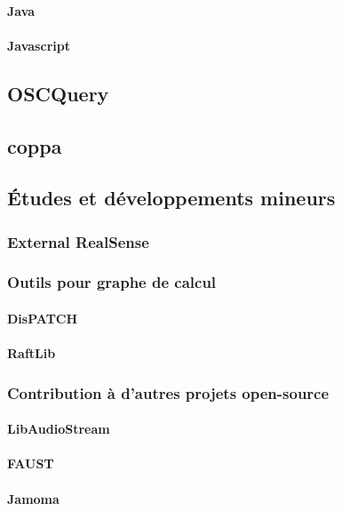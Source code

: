 \documentclass[french,a4paper,openany,12pt]{book}
\begin{document}
\paragraph{Java}
\paragraph{Javascript}
\subsection{OSCQuery}
\subsection{coppa}

\subsection{Études et développements mineurs}
\subsubsection{External RealSense}
\subsubsection{Outils pour graphe de calcul}
\paragraph{DisPATCH}
\paragraph{RaftLib}

\subsubsection{Contribution à d'autres projets open-source}
\paragraph{LibAudioStream}
\paragraph{FAUST}
\paragraph{Jamoma}
\end{document}
